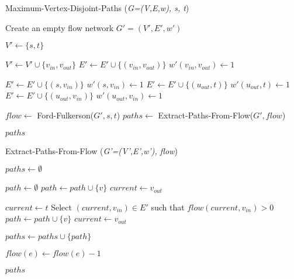\documentclass[UTF8, a4paper, 11pt]{report}
\begin{document}
\begin{algorithm}
    \caption{Maximum-Vertex-Disjoint-Paths (\textit{G=(V,E,w), s, t})}
    \begin{algorithmic}[1]
        \State Create an empty flow network $G' = (V', E', w')$

        \State $V' \gets \{s, t\}$

        \State $V' \gets V' \cup \{v_{in}, v_{out}\}$
        \State $E' \gets E' \cup \{(v_{in}, v_{out})\}$
        \State $w'(v_{in}, v_{out}) \gets 1$
        \EndFor

        \State $E' \gets E' \cup \{(s, v_{in})\}$
        \State $w'(s, v_{in}) \gets 1$
        \State $E' \gets E' \cup \{(u_{out}, t)\}$
        \State $w'(u_{out}, t) \gets 1$
        \Else
        \State $E' \gets E' \cup \{(u_{out}, v_{in})\}$
        \State $w'(u_{out}, v_{in}) \gets 1$
        \EndIf
        \EndFor

        \State $flow \gets$ Ford-Fulkerson($G', s, t$)
        \State $paths \gets$ Extract-Paths-From-Flow($G', flow$)

        \State \Return $paths$
    \end{algorithmic}
\end{algorithm}

\pagebreak

\begin{algorithm}
    \caption{Extract-Paths-From-Flow (\textit{G'=(V',E',w'), flow})}
    \begin{algorithmic}[1]
        \State $paths \gets \emptyset$ 

        \State $path \gets \emptyset$ 
        \State $path \gets path \cup \{v\}$
        \State $current \gets v_{out}$

        \State $current \gets t$
        \Else
        \State Select $(current, v_{in}) \in E'$ such that $flow(current, v_{in}) > 0$
        \State $path \gets path \cup \{v\}$
        \State $current \gets v_{out}$
        \EndIf
        \EndWhile

        \State $paths \gets paths \cup \{path\}$

        \State $flow(e) \gets flow(e) - 1$
        \EndFor
        \EndWhile

        \State \Return $paths$
    \end{algorithmic}
\end{algorithm}
\end{document}
